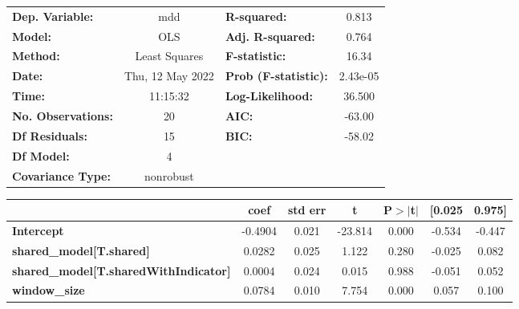 \begin{center}
\begin{tabular}{lclc}
\toprule
\textbf{Dep. Variable:}                       &       mdd        & \textbf{  R-squared:         } &     0.813   \\
\textbf{Model:}                               &       OLS        & \textbf{  Adj. R-squared:    } &     0.764   \\
\textbf{Method:}                              &  Least Squares   & \textbf{  F-statistic:       } &     16.34   \\
\textbf{Date:}                                & Thu, 12 May 2022 & \textbf{  Prob (F-statistic):} &  2.43e-05   \\
\textbf{Time:}                                &     11:15:32     & \textbf{  Log-Likelihood:    } &    36.500   \\
\textbf{No. Observations:}                    &          20      & \textbf{  AIC:               } &    -63.00   \\
\textbf{Df Residuals:}                        &          15      & \textbf{  BIC:               } &    -58.02   \\
\textbf{Df Model:}                            &           4      & \textbf{                     } &             \\
\textbf{Covariance Type:}                     &    nonrobust     & \textbf{                     } &             \\
\bottomrule
\end{tabular}
\begin{tabular}{lcccccc}
                                              & \textbf{coef} & \textbf{std err} & \textbf{t} & \textbf{P$> |$t$|$} & \textbf{[0.025} & \textbf{0.975]}  \\
\midrule
\textbf{Intercept}                            &      -0.4904  &        0.021     &   -23.814  &         0.000        &       -0.534    &       -0.447     \\
\textbf{shared\_model[T.shared]}              &       0.0282  &        0.025     &     1.122  &         0.280        &       -0.025    &        0.082     \\
\textbf{shared\_model[T.sharedWithIndicator]} &       0.0004  &        0.024     &     0.015  &         0.988        &       -0.051    &        0.052     \\
\textbf{window\_size}                         &       0.0784  &        0.010     &     7.754  &         0.000        &        0.057    &        0.100     \\

\end{tabular}
\end{center}

